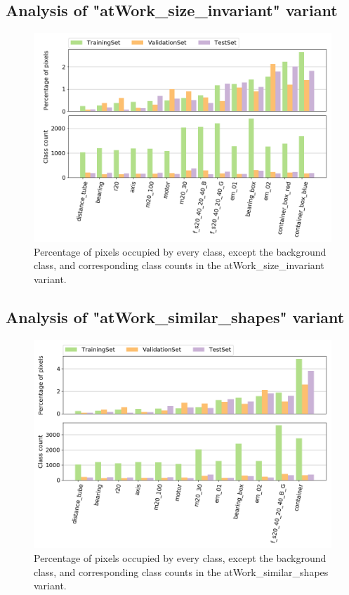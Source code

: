 	\subsection{Analysis of "atWork\_size\_invariant" variant}
		
		\begin{figure}
		\centering
			\includegraphics[scale=0.5]{images/size_noB}
			\caption{Percentage of pixels occupied by every class, except the background class, and corresponding class counts in the atWork\_size\_invariant variant.}
			\label{Fig:ana_size}
		\end{figure}
		
	\subsection{Analysis of "atWork\_similar\_shapes" variant}
		
		\begin{figure}
		\centering
			\includegraphics[scale=0.5]{images/shape_noB}
			\caption{Percentage of pixels occupied by every class, except the background class, and corresponding class counts in the atWork\_similar\_shapes variant.}
			\label{Fig:ana_shape}
		\end{figure}
		
